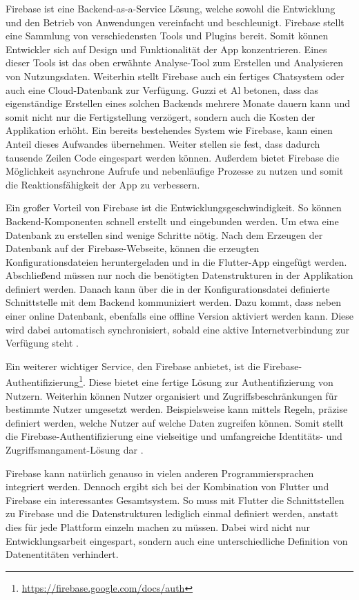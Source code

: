 Firebase ist eine Backend-as-a-Service Lösung, welche sowohl die Entwicklung und den Betrieb von Anwendungen vereinfacht und beschleunigt. Firebase stellt eine Sammlung von verschiedensten Tools und Plugins bereit. Somit können Entwickler sich auf Design und Funktionalität der App konzentrieren. Eines dieser Tools ist das oben erwähnte Analyse-Tool zum Erstellen und Analysieren von Nutzungsdaten. Weiterhin stellt Firebase auch ein fertiges Chatsystem oder auch eine Cloud-Datenbank zur Verfügung. Guzzi et Al \cite{Flutter_Apprentice} betonen, dass das eigenständige Erstellen eines solchen Backends mehrere Monate dauern kann und somit nicht nur die Fertigstellung verzögert, sondern auch die Kosten der Applikation erhöht. Ein bereits bestehendes System wie Firebase, kann einen Anteil dieses Aufwandes übernehmen. Weiter stellen sie fest, dass dadurch tausende Zeilen Code eingespart werden können. Außerdem bietet Firebase die Möglichkeit asynchrone Aufrufe und nebenläufige Prozesse zu nutzen und somit die Reaktionsfähigkeit der App zu verbessern.

Ein großer Vorteil von Firebase ist die Entwicklungsgeschwindigkeit. So können Backend-Komponenten schnell erstellt und eingebunden werden. Um etwa eine Datenbank zu erstellen sind wenige Schritte nötig. Nach dem Erzeugen der Datenbank auf der Firebase-Webseite, können die erzeugten Konfigurationsdateien heruntergeladen und in die Flutter-App eingefügt werden. Abschließend müssen nur noch die benötigten Datenstrukturen in der Applikation definiert werden. Danach kann über die in der Konfigurationsdatei definierte Schnittstelle mit dem Backend kommuniziert werden. Dazu kommt, dass neben einer online Datenbank, ebenfalls eine offline Version aktiviert werden kann. Diese wird dabei automatisch synchronisiert, sobald eine aktive Internetverbindung zur Verfügung steht \cite{flutter_firebase}.

Ein weiterer wichtiger Service, den Firebase anbietet, ist die Firebase-Authentifizierung\footnote{\url{https://firebase.google.com/docs/auth}}. Diese bietet eine fertige Lösung zur Authentifizierung von Nutzern. Weiterhin können Nutzer organisiert und Zugriffsbeschränkungen für bestimmte Nutzer umgesetzt werden. Beispielsweise kann mittels Regeln, präzise definiert werden, welche Nutzer auf welche Daten zugreifen können. Somit stellt die Firebase-Authentifizierung eine vielseitige und umfangreiche Identitäts- und Zugriffsmangament-Lösung dar \cite{Flutter_Apprentice}.

Firebase kann natürlich genauso in vielen anderen Programmiersprachen integriert werden. 
Dennoch ergibt sich bei der Kombination von Flutter und Firebase ein interessantes Gesamtsystem.
So muss mit Flutter die Schnittstellen zu Firebase und die Datenstrukturen lediglich einmal definiert werden, anstatt dies für jede Plattform einzeln machen zu müssen.
Dabei wird nicht nur Entwicklungsarbeit eingespart, sondern auch eine unterschiedliche Definition von Datenentitäten verhindert.


